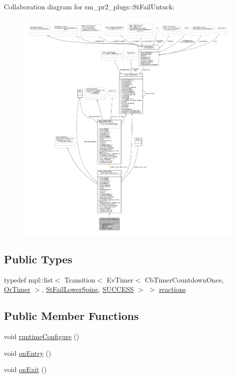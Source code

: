 Collaboration diagram for sm\+\_\+pr2\+\_\+plugs\+:\+:St\+Fail\+Untuck\+:
\nopagebreak
\begin{figure}[H]
\begin{center}
\leavevmode
\includegraphics[width=350pt]{structsm__pr2__plugs_1_1StFailUntuck__coll__graph}
\end{center}
\end{figure}
\subsection*{Public Types}
\begin{DoxyCompactItemize}
\item 
typedef mpl\+::list$<$ Transition$<$ Ev\+Timer$<$ Cb\+Timer\+Countdown\+Once, \hyperlink{classsm__pr2__plugs_1_1OrTimer}{Or\+Timer} $>$, \hyperlink{structsm__pr2__plugs_1_1StFailLowerSpine}{St\+Fail\+Lower\+Spine}, \hyperlink{classSUCCESS}{S\+U\+C\+C\+E\+SS} $>$ $>$ \hyperlink{structsm__pr2__plugs_1_1StFailUntuck_a0bdd7212772e86a51482f6b7cd162866}{reactions}
\end{DoxyCompactItemize}
\subsection*{Public Member Functions}
\begin{DoxyCompactItemize}
\item 
void \hyperlink{structsm__pr2__plugs_1_1StFailUntuck_af2e650b9c6962deb4740dd3e085a9978}{runtime\+Configure} ()
\item 
void \hyperlink{structsm__pr2__plugs_1_1StFailUntuck_a69433e67c586a0b7ebf7c7e06eacc8e5}{on\+Entry} ()
\item 
void \hyperlink{structsm__pr2__plugs_1_1StFailUntuck_af814cb213918aad29a7ad926b3609a25}{on\+Exit} ()
\end{DoxyCompactItemize}
